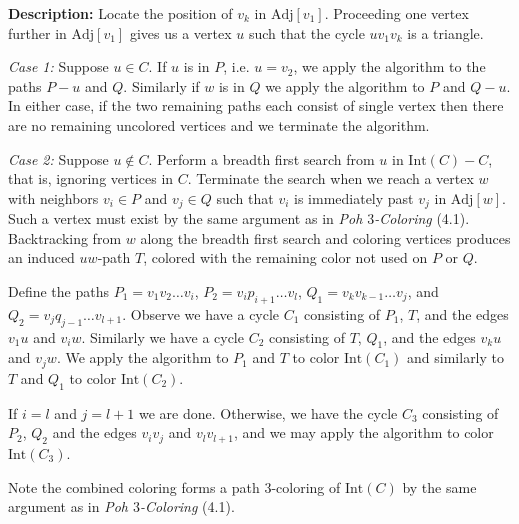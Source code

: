 \documentclass[letterpaper, 12pt]{article}
\theoremstyle{definition}
\theoremstyle{definition}
\theoremstyle{thm}
\theoremstyle{definition}
\begin{document}
\noindent\textbf{Description:} Locate the position of $v_k$ in
$\text{Adj}[v_1]$. Proceeding one vertex further in $\text{Adj}[v_1]$ gives us a
vertex $u$ such that the cycle $uv_1v_k$ is a triangle.

\textit{Case 1:} Suppose $u\in C$. If $u$ is in $P$, i.e. $u=v_2$, we apply the
algorithm to the paths $P-u$ and $Q$. Similarly if $w$ is in $Q$ we apply the
algorithm to $P$ and $Q-u$. In either case, if the two remaining paths each
consist of single vertex then there are no remaining uncolored vertices and we
terminate the algorithm.

\textit{Case 2:} Suppose $u\not\in C$. Perform a breadth first search from $u$
in $\text{Int}(C)-C$, that is, ignoring vertices in $C$. Terminate the search
when we reach a vertex
$w$ with neighbors $v_i\in P$ and $v_j \in Q$ such that $v_i$ is immediately
past $v_j$ in $\text{Adj}[w]$. Such a vertex must exist by the same argument
as in \textit{Poh $3$-Coloring} (4.1).
Backtracking from $w$ along the breadth first search and coloring vertices
produces an induced $uw$-path $T$, colored with the remaining color not used on
$P$ or $Q$.

Define the paths $P_1=v_1v_2\ldots v_i$, $P_2=v_ip_{i+1}\ldots v_l$,
$Q_1=v_kv_{k-1}\ldots v_j$, and $Q_2=v_jq_{j-1}\ldots v_{l+1}$. Observe we
have a cycle $C_1$ consisting of $P_1$, $T$, and the edges $v_1u$ and $v_iw$.
Similarly we have a cycle $C_2$ consisting of $T$, $Q_1$, and the edges $v_ku$
and $v_jw$. We apply the algorithm to $P_1$ and $T$ to color $\text{Int}(C_1)$
and similarly to $T$ and $Q_1$ to color $\text{Int}(C_2)$.

If $i=l$ and
$j=l+1$ we are done. Otherwise, we have the cycle $C_3$ consisting of $P_2$,
$Q_2$ and the edges $v_iv_j$ and $v_lv_{l+1}$, and we may apply the algorithm to
color $\text{Int}(C_3)$.

Note the combined coloring forms a path $3$-coloring of $\text{Int}(C)$ by the
same argument as in \textit{Poh $3$-Coloring} (4.1).
\end{document}
